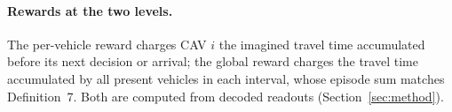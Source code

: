\paragraph{Rewards at the two levels.}
The per-vehicle reward charges CAV \(i\) the imagined travel time
accumulated before its next decision or arrival; the global reward charges
the travel time accumulated by all present vehicles in each interval, whose
episode sum matches Definition~7.  Both are computed from decoded readouts
(Section~\ref{sec:method}).
